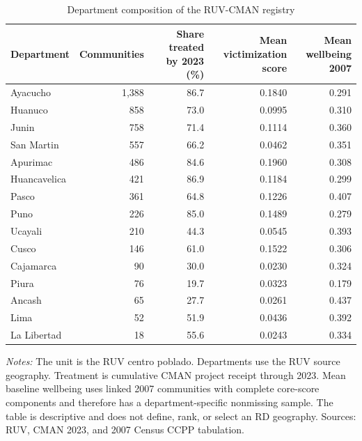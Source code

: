 \begin{table}[!htbp]
\centering
\caption{Department composition of the RUV-CMAN registry}
\label{tab:desc_department_profile}
\begin{tabular}{lrrrr}
\toprule
Department & Communities & Share treated by 2023 (\%) & Mean victimization score & Mean wellbeing 2007 \\
\midrule
Ayacucho & 1,388 & 86.7 & 0.1840 & 0.291 \\
Huanuco & 858 & 73.0 & 0.0995 & 0.310 \\
Junin & 758 & 71.4 & 0.1114 & 0.360 \\
San Martin & 557 & 66.2 & 0.0462 & 0.351 \\
Apurimac & 486 & 84.6 & 0.1960 & 0.308 \\
Huancavelica & 421 & 86.9 & 0.1184 & 0.299 \\
Pasco & 361 & 64.8 & 0.1226 & 0.407 \\
Puno & 226 & 85.0 & 0.1489 & 0.279 \\
Ucayali & 210 & 44.3 & 0.0545 & 0.393 \\
Cusco & 146 & 61.0 & 0.1522 & 0.306 \\
Cajamarca & 90 & 30.0 & 0.0230 & 0.324 \\
Piura & 76 & 19.7 & 0.0323 & 0.179 \\
Ancash & 65 & 27.7 & 0.0261 & 0.437 \\
Lima & 52 & 51.9 & 0.0436 & 0.392 \\
La Libertad & 18 & 55.6 & 0.0243 & 0.334 \\
\bottomrule
\end{tabular}
\parbox{0.98\linewidth}{\footnotesize \textit{Notes:} The unit is the RUV centro poblado. Departments use the RUV source geography. Treatment is cumulative CMAN project receipt through 2023. Mean baseline wellbeing uses linked 2007 communities with complete core-score components and therefore has a department-specific nonmissing sample. The table is descriptive and does not define, rank, or select an RD geography. Sources: RUV, CMAN 2023, and 2007 Census CCPP tabulation.}
\end{table}
